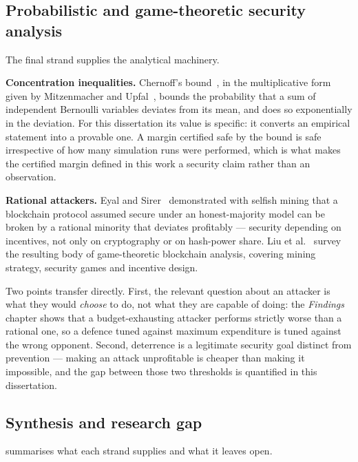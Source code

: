 \subsection{Probabilistic and game-theoretic security analysis}
\label{sec:lit-probgame}

The final strand supplies the analytical machinery.

\textbf{Concentration inequalities.} Chernoff's
bound~\cite{chernoff1952}, in the multiplicative form given by
Mitzenmacher and Upfal~\cite{mitzenmacher2017}, bounds the probability
that a sum of independent Bernoulli variables deviates from its mean,
and does so exponentially in the deviation. For this dissertation its
value is specific: it converts an empirical statement into a provable
one. A margin certified safe by the bound is safe irrespective of how
many simulation runs were performed, which is what makes the certified
margin defined in this work a security claim rather than an
observation.

\textbf{Rational attackers.} Eyal and Sirer~\cite{eyal2014}
demonstrated with selfish mining that a blockchain protocol assumed
secure under an honest-majority model can be broken by a rational
minority that deviates profitably --- security depending on incentives,
not only on cryptography or on hash-power share. Liu et
al.~\cite{liu2019} survey the resulting body of game-theoretic
blockchain analysis, covering mining strategy, security games and
incentive design.

Two points transfer directly. First, the relevant question about an
attacker is what they would \emph{choose} to do, not what they are
capable of doing: the \emph{Findings} chapter shows that a
budget-exhausting attacker performs strictly worse than a rational one,
so a defence tuned against maximum expenditure is tuned against the
wrong opponent. Second, deterrence is a legitimate security goal
distinct from prevention --- making an attack unprofitable is cheaper
than making it impossible, and the gap between those two thresholds is
quantified in this dissertation.

\subsection{Synthesis and research gap}
\label{sec:lit-synthesis}

 summarises what each strand supplies and what it
leaves open.

